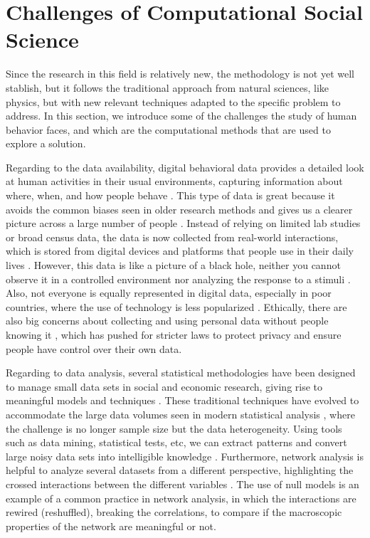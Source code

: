 \section{\label{sec:Challenges of Computational Social Science} Challenges of Computational Social Science}

Since the research in this field is relatively new, the methodology is not yet well stablish, but it follows the traditional approach from natural sciences, like physics, but with new relevant techniques adapted to the specific problem to address. In this section, we introduce some of the challenges the study of human behavior faces, and which are the computational methods that are used to explore a solution.

Regarding to the data availability, digital behavioral data provides a detailed look at human activities in their usual environments, capturing information about where, when, and how people behave \cite{Eagle2006RealityMining}. This type of data is great because it avoids the common biases seen in older research methods and gives us a clearer picture across a large number of people \cite{lazer-2009,chen-2014}. Instead of relying on limited lab studies or broad census data, the data is now collected from real-world interactions, which is stored from digital devices and platforms that people use in their daily lives \cite{Eckmann2004Entropy,blondel-2015,artime-2017}. However, this data is like a picture of a black hole, neither you cannot observe it in a controlled environment nor analyzing the response to a stimuli \cite{lazer-2014}. Also, not everyone is equally represented in digital data, especially in poor countries, where the use of technology is less popularized \cite{zook-2017}. Ethically, there are also big concerns about collecting and using personal data without people knowing it \cite{boyd-2012, de-montjoye-2013}, which has pushed for stricter laws to protect privacy and ensure people have control over their own data.

Regarding to data analysis, several statistical methodologies have been designed to manage small data sets in social and economic research, giving rise to meaningful models and techniques \cite{stevens-2012, gelman-2006}. These traditional techniques have evolved to accommodate the large data volumes seen in modern statistical analysis \cite{hastie-2013}, where the challenge is no longer sample size but the data heterogeneity. Using tools such as data mining, statistical tests, etc, we can extract patterns and convert large noisy data sets into intelligible knowledge \cite{witten-2005}. Furthermore, network analysis is helpful to analyze several datasets from a different perspective, highlighting the crossed interactions between the different variables \cite{newman-book, clauset-2008}. The use of null models \cite{perry2012null,gauvin-2022} is an example of a common practice in network analysis, in which the interactions are rewired (reshuffled), breaking the correlations, to compare if the macroscopic properties of the network are meaningful or not.

